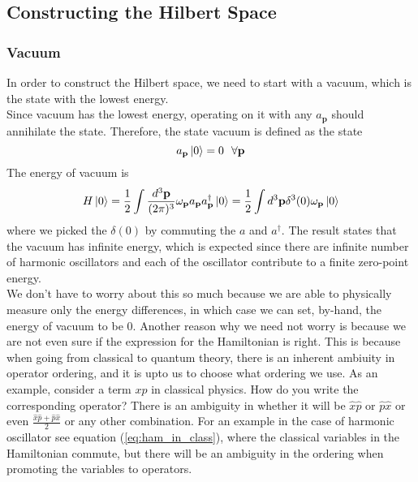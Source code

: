 \documentclass[11pt]{article}
\newcommand{\w}{\omega}
\numberwithin{equation}{section}
\begin{document}
    \subsection{Constructing the Hilbert Space}
    \subsubsection{Vacuum}
    In order to construct the Hilbert space, we need to start with a vacuum, which is the state with the lowest energy. \\
    Since vacuum has the lowest energy, operating on it with any \(a_\textbf{p}\) should annihilate the state. Therefore, the state vacuum is defined as the state 
    \begin{equation*}
        a_\textbf{p}\ket{0} = 0 ~~\forall \textbf{p}
    \end{equation*}
    The energy of vacuum is 
    \begin{equation*}
        H\ket{0} = \frac{1}{2}\int \frac{d^3\textbf{p}}{(2\pi)^3}\w_\textbf{p} a_\textbf{p} a^\dagger_\textbf{p}\ket{0} =  \frac{1}{2}\int  d^3\textbf{p} \delta^3(0) \w_\textbf{p} \ket{0}
    \end{equation*}
    where we picked the \(\delta(0)\) by commuting the \(a\) and \(a^\dagger\). The result states that the vacuum has infinite energy, which is expected since there are infinite number of harmonic oscillators and each of the oscillator contribute to a finite zero-point energy.\\

    We don't have to worry about this so much because we are able to physically measure only the energy differences, in which case we can set, by-hand, the energy of vacuum to be 0. Another reason why we need not worry is because we are not even sure if the expression for the Hamiltonian is right. This is because when going from classical to quantum theory, there is an inherent ambiuity in operator ordering, and it is upto us to choose what ordering we use. 
    As an example, consider a term \(xp\) in classical physics. How do you write the corresponding operator? There is an ambiguity in whether it will be \(\hat x \hat p\) or \(\hat p \hat x\) or even \(\displaystyle\frac{\hat x \hat p + \hat p \hat x}{2}\) or any other combination. For an example in the case of harmonic oscillator see equation (\ref{eq:ham_in_class}), where the classical variables in the Hamiltonian commute, but there will be an ambiguity in the ordering when promoting the variables to operators. \\
\end{document}
